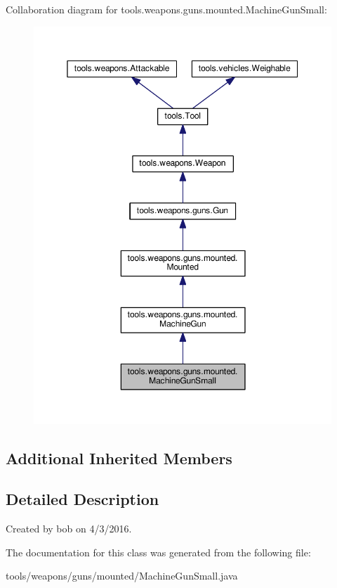 Collaboration diagram for tools.\+weapons.\+guns.\+mounted.\+Machine\+Gun\+Small\+:
\nopagebreak
\begin{figure}[H]
\begin{center}
\leavevmode
\includegraphics[width=350pt]{classtools_1_1weapons_1_1guns_1_1mounted_1_1_machine_gun_small__coll__graph}
\end{center}
\end{figure}
\subsection*{Additional Inherited Members}


\subsection{Detailed Description}
Created by bob on 4/3/2016. 

The documentation for this class was generated from the following file\+:\begin{DoxyCompactItemize}
\item 
tools/weapons/guns/mounted/Machine\+Gun\+Small.\+java\end{DoxyCompactItemize}

